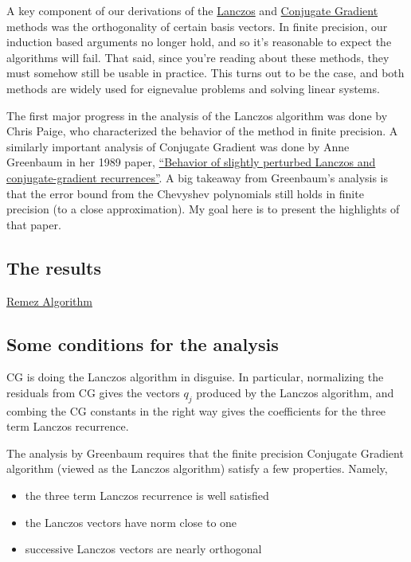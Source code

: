 A key component of our derivations of the
\href{./arnoldi_lanczos.html}{Lanczos} and
\href{./cg_derivation.html}{Conjugate Gradient} methods was the
orthogonality of certain basis vectors. In finite precision, our
induction based arguments no longer hold, and so it's reasonable to
expect the algorithms will fail. That said, since you're reading about
these methods, they must somehow still be usable in practice. This turns
out to be the case, and both methods are widely used for eignevalue
problems and solving linear systems.

The first major progress in the analysis of the Lanczos algorithm was
done by Chris Paige, who characterized the behavior of the method in
finite precision. A similarly important analysis of Conjugate Gradient
was done by Anne Greenbaum in her 1989 paper,
\href{https://www.sciencedirect.com/science/article/pii/0024379589902851}{``Behavior
of slightly perturbed Lanczos and conjugate-gradient recurrences''}. A
big takeaway from Greenbaum's analysis is that the error bound from the
Chevyshev polynomials still holds in finite precision (to a close
approximation). My goal here is to present the highlights of that paper.

\hypertarget{the-results}{%
\subsection{The results}\label{the-results}}

\href{./remez.html}{Remez Algorithm}

\hypertarget{some-conditions-for-the-analysis}{%
\subsection{Some conditions for the
analysis}\label{some-conditions-for-the-analysis}}

CG is doing the Lanczos algorithm in disguise. In particular,
normalizing the residuals from CG gives the vectors \(q_j\) produced by
the Lanczos algorithm, and combing the CG constants in the right way
gives the coefficients for the three term Lanczos recurrence.

The analysis by Greenbaum requires that the finite precision Conjugate
Gradient algorithm (viewed as the Lanczos algorithm) satisfy a few
properties. Namely,

\begin{itemize}
\tightlist
\item
  the three term Lanczos recurrence is well satisfied
\item
  the Lanczos vectors have norm close to one
\item
  successive Lanczos vectors are nearly orthogonal
\end{itemize}

